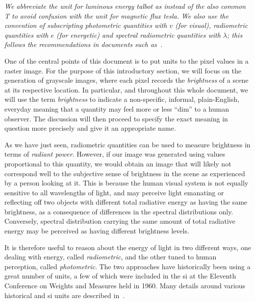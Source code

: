 \begin{table}
{}
\vskip 1mm
{\footnotesize\it We abbreviate the unit for luminous energy \textit{talbot} as
\unit{\talbot} instead of the also common \unit{\tesla} to avoid confusion with the
unit for magnetic flux \textit{tesla}.
We also use the convention of subscripting photometric quantities
with $v$ (for \textit{visual}), radiometric quantities with $e$ (for
\textit{energetic}) and spectral radiometric quantities with $\lambda$;
this follows the recommendations in documents such as~\cite{united1967usa}.}
\end{table}

One of the central points of this document is to put units to the pixel values in a raster image. 
For the purpose of this introductory section, we will focus on the generation of grayscale images, where each pixel records the \textsl{\gls{brightness}} of a scene at its respective location. In particular, and throughout this whole document, we will use the term \textsl{brightness} to indicate a non-specific, informal, plain-English, everyday meaning that a quantity may feel more or less ``dim'' to a human observer. 
The discussion will then proceed to specify the exact meaning in question more precisely and give it an appropriate name.

As we have just seen, radiometric quantities can be used to measure brightness in terms of \emph{\gls{radiant power}}.
However, if our image was generated using values proportional to this quantity,
we would obtain an image that will likely not correspond well to the subjective sense of brightness in the scene as experienced by a person looking at it. 
This is because the human visual system is not equally sensitive to all wavelengths
of light, and may perceive light emanating or reflecting off two objects with different total radiative energy as having the same brightness, as a consequence of differences in the spectral distributions only. 
Conversely, \gls{spectral distribution} carrying the same amount
of total radiative energy may be perceived as having different brightness levels.

It is therefore useful to reason about the energy of light in two
different ways, one dealing with energy, called \textsl{radiometric}, and the
other tuned to human perception, called \textsl{photometric}. The two approaches
have historically been using a great number of units, a few of which were
included in the \gls{si} at the Eleventh Conference on Weights and Measures
held in 1960.  Many details around various historical and \gls{si} units are
described in~\cite{Meyer-Arendt:68}.

